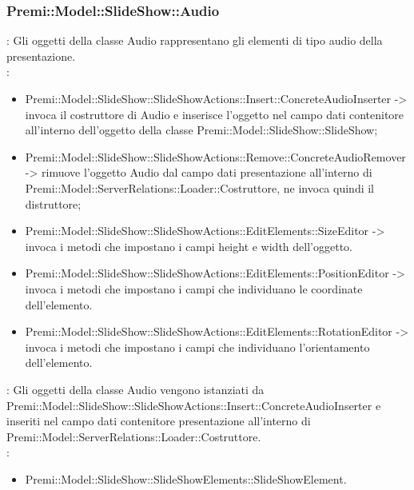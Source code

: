 {                    \subsubsection{Premi::Model::SlideShow::Audio}{
				\textbf{\tipo}: Gli oggetti della classe Audio rappresentano gli elementi di tipo audio della presentazione.\\
				\textbf{\relaz}: 
				\begin{itemize}
					\item Premi::Model::SlideShow::SlideShowActions::Insert::ConcreteAudioInserter -> invoca il costruttore di Audio e inserisce l’oggetto nel campo dati contenitore all’interno dell’oggetto della classe Premi::Model::SlideShow::SlideShow;
                    \item Premi::Model::SlideShow::SlideShowActions::Remove::ConcreteAudioRemover -> rimuove l’oggetto Audio dal campo dati presentazione all’interno di Premi::Model::ServerRelations::Loader::Costruttore, ne invoca quindi il distruttore;
                    \item Premi::Model::SlideShow::SlideShowActions::EditElements::SizeEditor -> invoca i metodi che impostano i campi height e width dell'oggetto.
                    \item Premi::Model::SlideShow::SlideShowActions::EditElements::PositionEditor -> invoca i metodi che impostano i campi che individuano le coordinate dell'elemento.
                    \item Premi::Model::SlideShow::SlideShowActions::EditElements::RotationEditor -> invoca i metodi che impostano i campi che individuano l'orientamento dell'elemento.
				\end{itemize}	
                \textbf{\interfacce}: Gli oggetti della classe Audio vengono istanziati da Premi::Model::SlideShow::SlideShowActions::Insert::ConcreteAudioInserter e inseriti nel campo dati contenitore presentazione all’interno di Premi::Model::ServerRelations::Loader::Costruttore.\\
                \textbf{\base}: 
                    \begin{itemize}
                    \item Premi::Model::SlideShow::SlideShowElements::SlideShowElement.
                    \end{itemize}
                    }
}
